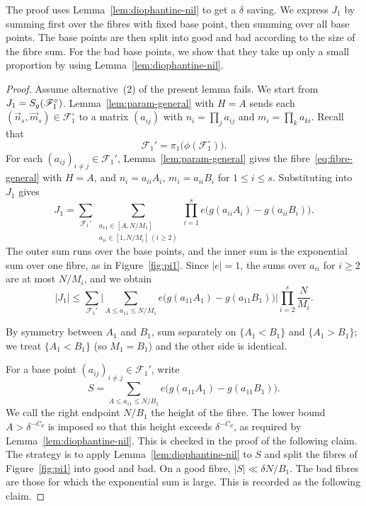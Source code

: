 The proof uses Lemma~\ref{lem:diophantine-nil} to get a $\delta$ saving.
We express \(J_1\) by summing first over the fibres with fixed base point,
then summing over all base points. The base points are then split into good and bad according to the size of the fibre sum.
For the bad base points, we show that they take up only a small proportion by using Lemma~\ref{lem:diophantine-nil}.

\begin{proof}
Assume alternative~(2) of the present lemma fails.
We start from $J_1=S_g\!\left(\mathscr{F}_1^\circ\right)$.
Lemma~\ref{lem:param-general} with $H=A$ sends each $(\vec{n}_s,\vec{m}_s)\in\mathscr{F}_1^\circ$ to a matrix $(a_{ij})$ with $n_i=\prod_j a_{ij}$ and $m_i=\prod_k a_{ki}$.
Recall that
\[
\mathscr{F}_1'
=\pi_1\bigl(\phi(\mathscr{F}_1^\circ)\bigr).
\]
For each $(a_{ij})_{i\neq j}\in\mathscr{F}_1'$, Lemma~\ref{lem:param-general} gives the fibre~\eqref{eq:fibre-general} with $H=A$, and $n_i=a_{ii}A_i$, $m_i=a_{ii}B_i$ for $1\leq i\leq s$.
Substituting into $J_1$ gives
\[
J_1=\sum_{\mathscr{F}_1'}\sum_{\substack{a_{11}\in[A,N/M_1]\\ a_{ii}\in[1,N/M_i]\ (i\geq 2)}}\prod_{i=1}^s e\bigl(g(a_{ii}A_i)-g(a_{ii}B_i)\bigr).
\]
The outer sum runs over the base points, and the inner sum is the exponential sum over one fibre, as in Figure~\ref{fig:pi1}.
Since $|e|=1$, the sums over $a_{ii}$ for $i\geq 2$ are at most $N/M_i$, and we obtain
\begin{equation}\label{eq:J1-bound}
|J_1|\leq \sum_{\mathscr{F}_1'}\Big|\sum_{A\leq a_{11}\leq N/M_1} e\big(g(a_{11}A_1)-g(a_{11}B_1)\big)\Big|
\prod_{i=2}^s\frac{N}{M_i}.
\end{equation}

By symmetry between $A_1$ and $B_1$, sum separately on $\{A_1<B_1\}$ and $\{A_1>B_1\}$; we treat $\{A_1<B_1\}$ (so $M_1=B_1$) and the other side is identical.

For a base point $(a_{ij})_{i\neq j}\in\mathscr{F}_1'$, write
\[
S=\sum_{A\leq a_{11}\leq N/B_1} e\big(g(a_{11}A_1)-g(a_{11}B_1)\big).
\]
We call the right endpoint $N/B_1$ the height of the fibre. The lower bound $A>\delta^{-C_d}$ is imposed so that this height exceeds $\delta^{-C_d}$, as required by Lemma~\ref{lem:diophantine-nil}. This is checked in the proof of the following claim.
The strategy is to apply Lemma~\ref{lem:diophantine-nil} to $S$ and split the fibres of Figure~\ref{fig:pi1} into good and bad.
On a good fibre, $|S|\ll\delta N/B_1$.
The bad fibres are those for which the exponential sum is large.
This is recorded as the following claim.


\end{proof}
